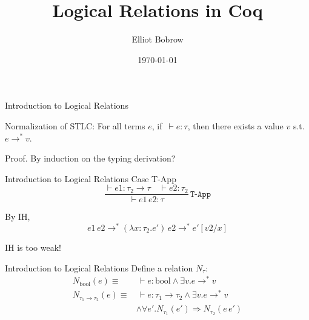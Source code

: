 \documentclass{beamer}
\title{Logical Relations in Coq}
\author{Elliot Bobrow}
\institute{UPenn REPL}
\date{\today}
\begin{document}
\begin{frame}
\titlepage
\end{frame}

\begin{frame}{Introduction to Logical Relations}
    \begin{theorem}
        Normalization of STLC: For all terms $e$, if $\,\vdash e : \tau$, then there exists a value $v$ s.t. $e\rightarrow^* v$.
    \end{theorem}
    \begin{block}{Proof.}
        By induction on the typing derivation?
    \end{block}
\end{frame}

\begin{frame}{Introduction to Logical Relations}
    Case T-App $$\frac{\vdash e1 : \tau_2 \rightarrow \tau \quad \vdash e2 : \tau_2}{\vdash e1\,e2 : \tau}\,\texttt{T-App}$$

        By IH,
        $$
        e1\,e2 \rightarrow^* (\lambda x:\tau_2.e')\,e2 \rightarrow^* e'[v2/x]
        $$
        \pause
        \vspace{2em}
        \centerline{\alert{IH is too weak!}}
\end{frame}

\begin{frame}{Introduction to Logical Relations}
    Define a relation $N_\tau$:
    \pause
    \begin{align*}
        N_{\text{bool}}(e) \equiv &\,\vdash e:\text{bool} \wedge \exists v . e \rightarrow^* v \\
        N_{\tau_1\rightarrow\tau_2}(e) \equiv &\,\vdash e: \tau_1\rightarrow\tau_2 \wedge\exists v . e \rightarrow^* v \\
        &\wedge \forall e'. N_{\tau_1}(e') \Rightarrow N_{\tau_2}(e\, e')
    \end{align*}
\end{frame}
\end{document}
